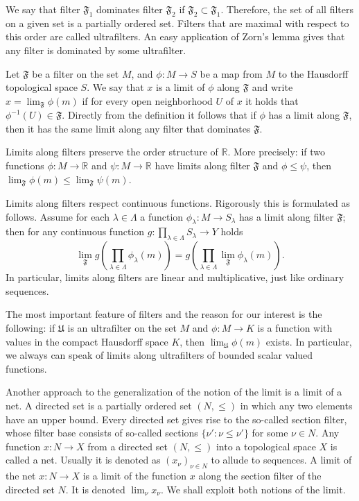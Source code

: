 We say that filter $\mathfrak{F}_1$ dominates filter $\mathfrak{F}_2$ if
$\mathfrak{F}_2\subset\mathfrak{F}_1$. Therefore, the set of all filters on a
given set is a partially ordered set. Filters that are maximal with respect to
this order are called ultrafilters. An easy application of Zorn's lemma gives
that any filter is dominated by some ultrafilter.

Let $\mathfrak{F}$ be a filter on the set $M$, and $\phi:M\to S$ be a map from
$M$ to the Hausdorff topological space $S$. We say that $x$ is a limit of $\phi$
along $\mathfrak{F}$ and write $x=\lim_{\mathfrak{F}} \phi(m)$ if for every open
neighborhood $U$ of $x$ it holds that $\phi^{-1}(U)\in\mathfrak{F}$. Directly from the
definition it follows that if $\phi$ has a limit along $\mathfrak{F}$, then it
has the same limit along any filter that dominates $\mathfrak{F}$. 

Limits along filters preserve the order structure of $\mathbb{R}$. More precisely: if
two functions $\phi:M\to\mathbb{R}$ and $\psi:M\to\mathbb{R}$ have limits along
filter $\mathfrak{F}$ and $\phi\leq\psi$, then 
$
\lim_{\mathfrak{F}}\phi(m)\leq\lim_{\mathfrak{F}}\psi(m).
$

Limits along filters respect continuous functions. Rigorously this is formulated as
follows. Assume for each $\lambda\in\Lambda$ a function $\phi_\lambda:M\to
S_\lambda$ has a limit along filter $\mathfrak{F}$; then for any continuous
function $g:\prod_{\lambda\in\Lambda}S_\lambda\to Y$ holds
\[
\lim_{\mathfrak{F}}g\left(
  \prod_{\lambda\in\Lambda}\phi_\lambda(m)
\right)
=g\left(\prod_{\lambda\in\Lambda}\lim_{\mathfrak{F}}\phi_\lambda(m)\right).
\]
In particular, limits along filters are linear and multiplicative, just like
ordinary sequences.

The most important feature of filters and the reason for our interest is the
following: if $\mathfrak{U}$ is an ultrafilter on the set $M$ and $\phi:M\to K$
is a function with values in the compact Hausdorff space $K$, then
$\lim_{\mathfrak{U}}\phi(m)$ exists. In particular, we always can speak of
limits along ultrafilters of bounded scalar valued functions.

Another approach to the generalization of the notion of the limit is a limit of
a net. A directed set is a partially ordered set $(N,\leq)$ in which any two
elements have an upper bound. Every directed set gives rise to the so-called
section filter, whose filter base consists of so-called sections $
\{\nu':\nu\leq\nu' \}$ for some $\nu\in N$. Any function $x:N\to X$ from a
directed set $(N,\leq)$ into a topological space $X$ is called a net. Usually
it is denoted as ${(x_\nu)}_{\nu\in N}$ to allude to sequences. 
A limit of the net $x:N\to X$ is a limit of the function $x$ along the section
filter of the directed set $N$. It is denoted $\lim_\nu x_\nu$. We shall exploit
both notions of the limit.

